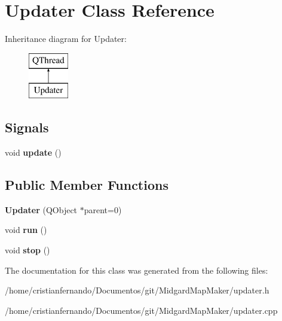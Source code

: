 \hypertarget{class_updater}{\section{Updater Class Reference}
\label{class_updater}
}
Inheritance diagram for Updater\-:\begin{figure}[H]
\begin{center}
\leavevmode
\includegraphics[height=2.000000cm]{class_updater}
\end{center}
\end{figure}
\subsection*{Signals}
\begin{DoxyCompactItemize}
\item 
\hypertarget{class_updater_a812f33261822358f982fbb932a3de65d}{void {\bfseries update} ()}\label{class_updater_a812f33261822358f982fbb932a3de65d}

\end{DoxyCompactItemize}
\subsection*{Public Member Functions}
\begin{DoxyCompactItemize}
\item 
\hypertarget{class_updater_adb60a473bc174de0ee06ee09c814e1a2}{{\bfseries Updater} (Q\-Object $\ast$parent=0)}\label{class_updater_adb60a473bc174de0ee06ee09c814e1a2}

\item 
\hypertarget{class_updater_abd76987a878910ff4687cac6cd63859d}{void {\bfseries run} ()}\label{class_updater_abd76987a878910ff4687cac6cd63859d}

\item 
\hypertarget{class_updater_a1bf91b5b0d6a3d3edd7da8ede14f5746}{void {\bfseries stop} ()}\label{class_updater_a1bf91b5b0d6a3d3edd7da8ede14f5746}

\end{DoxyCompactItemize}


The documentation for this class was generated from the following files\-:\begin{DoxyCompactItemize}
\item 
/home/cristianfernando/\-Documentos/git/\-Midgard\-Map\-Maker/updater.\-h\item 
/home/cristianfernando/\-Documentos/git/\-Midgard\-Map\-Maker/updater.\-cpp\end{DoxyCompactItemize}
